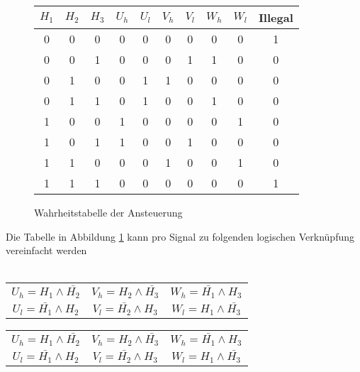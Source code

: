         \begin{figure}[h!]
            \begin{tabular}{ccc||cc|cc|cc||c}
                 $H_1$ & $H_2$ & $H_3$ & $U_h$ & $U_l$ & $V_h$ & $V_l$ & $W_h$ & $W_l$ & Illegal\\
            \hline 0   &   0   &   0   &   0   &   0   &   0   &   0   &   0   &   0   &   1\\
                   0   &   0   &   1   &   0   &   0   &   0   &   1   &   1   &   0   &   0\\
                   0   &   1   &   0   &   0   &   1   &   1   &   0   &   0   &   0   &   0\\
                   0   &   1   &   1   &   0   &   1   &   0   &   0   &   1   &   0   &   0\\
                   1   &   0   &   0   &   1   &   0   &   0   &   0   &   0   &   1   &   0\\
                   1   &   0   &   1   &   1   &   0   &   0   &   1   &   0   &   0   &   0\\
                   1   &   1   &   0   &   0   &   0   &   1   &   0   &   0   &   1   &   0\\
                   1   &   1   &   1   &   0   &   0   &   0   &   0   &   0   &   0   &   1\\
            \end{tabular}
           	\centering
           	\caption{Wahrheitstabelle der Ansteuerung} 
            \label{abb:WahrheitstabelleAnsteuerung}
        \end{figure}
        \parindent 0pt Die Tabelle in Abbildung 
        \ref{abb:WahrheitstabelleAnsteuerung} kann pro Signal zu folgenden 
        logischen Verknüpfung vereinfacht werden\\
        \\
        \ifSTANDALONE
        \begin{table}
            \centering
            \begin{tabular}{ccc}
                $U_h = H_1 \wedge \bar{H_2}$ & $V_h = H_2 \wedge \bar{H_3}$ & $W_h = \bar{H_1} \wedge H_3$\\
                $U_l = \bar{H_1} \wedge H_2$ & $V_l = \bar{H_2} \wedge H_3$ & $W_l = H_1 \wedge \bar{H_3}$
            \end{tabular}
        \end{table}
        \fi
        \ifEMBED
        \begin{tabular}{ccc}
            $U_h = H_1 \wedge \bar{H_2}$ & $V_h = H_2 \wedge \bar{H_3}$ & $W_h = \bar{H_1} \wedge H_3$\\
            $U_l = \bar{H_1} \wedge H_2$ & $V_l = \bar{H_2} \wedge H_3$ & $W_l = H_1 \wedge \bar{H_3}$
        \end{tabular}
        \fi
